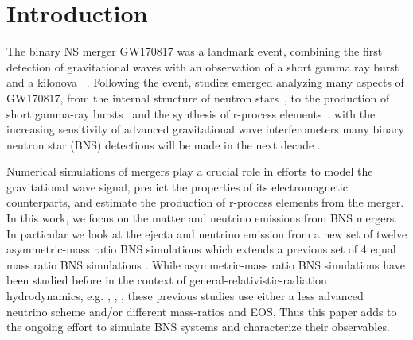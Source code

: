 \section{Introduction}


The binary NS merger GW170817 was a landmark event, combining the first detection of gravitational waves
with an observation of a short gamma ray burst and a kilonova ~\cite{theligoscientific:2017qsa,gbm:2017lvd,2017apj...848l..13a,ajello2018fermi}. Following the event, studies emerged analyzing many aspects of GW170817, from the
internal structure of neutron stars~\cite{read:2008iy,delpozzo:13,lackey2014,gw170817-nsradius,gw170817-pe}, to the production of short gamma-ray bursts~\cite{moch:93,lee1999a,janka1999,gbm:2017lvd,2017apj...848l..13a,2018natur.561..355m} and the synthesis of r-process elements~\cite{  li:1998bw,1976apj...210..549l,rosswog:1998hy, 2005astro.ph.10256k,2010mnras.406.2650m,metzger2017,2017sci...358.1559k,2017sci...358.1556c,2017apj...848l..19c,2017sci...358.1556c,cowperthwaite:2017dyu,2017natur.551...80k,2017sci...358.1583k,2017apj...848l..32m,2017apj...848l..18n,2017natur.551...67p,2017natur.551...75s,2017apj...848l..16s,2017apj...848l..27t,2017sci...358.1565e}. with the increasing sensitivity of advanced gravitational wave
interferometers many binary neutron star (BNS) detections will
be made in the next decade \cite{ligo2018gwtc}.

Numerical simulations of mergers
play a crucial role in efforts to model the gravitational
wave signal, predict the properties of its electromagnetic counterparts,
and estimate the production of r-process elements from the merger. In this work, we
focus on the matter and neutrino emissions from BNS mergers. In particular we look at the ejecta
and neutrino emission from a new set of twelve asymmetric-mass ratio BNS simulations
which extends a previous set of 4 equal mass ratio BNS simulations \cite{foucart:2015gaa}. While asymmetric-mass ratio
BNS simulations have been studied before in the context of general-relativistic-radiation
hydrodynamics, e.g. \cite{sekiguchi2016dynamical}, \cite{lehner2016unequal}, \cite{radice2016dynamical},
these previous studies use either a less advanced neutrino scheme and/or
different mass-ratios and EOS. Thus this paper adds to the ongoing effort to simulate
BNS systems and characterize their observables.

